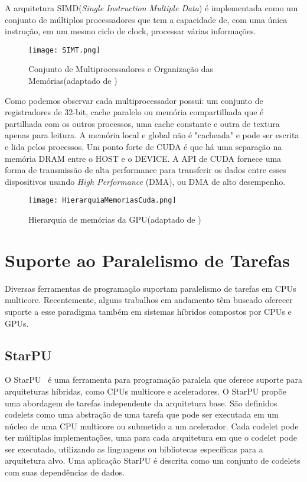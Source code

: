 A arquitetura SIMD(\textit{Single Instruction Multiple Data}) é implementada como um conjunto de múltiplos processadores que tem a capacidade de, com uma única instrução, em um mesmo ciclo de clock, processar várias informações.

\begin{figure}[!htb]
	\begin{center}
	\centering
			\texttt{[image: SIMT.png]}
	\label{fig: SIMT}
	\caption{Conjunto de Multiprocessadores e Organização das Memórias(adaptado de \cite{cuda})}
	\end{center}
\end{figure}

Como podemos observar cada multiprocessador possui: um conjunto de registradores de 32-bit, cache paralelo ou memória compartilhada que é partilhada com os outros processos, uma cache constante e outra de textura apenas para leitura. A memória local e global não é "cacheada" e pode ser escrita e lida pelos processos.
Um ponto forte de CUDA é que há uma separação na memória DRAM entre o HOST e o DEVICE. A API de CUDA fornece uma forma de transmissão de alta performance para transferir os dados entre esses dispositivos usando \textit{High Performance} (DMA), ou DMA de alto desempenho.

\begin{figure}[!htb]
	\begin{center}
	\centering
			\texttt{[image: HierarquiaMemoriasCuda.png]}
	\label{fig: HierarquiaMemoriasCuda}
	\caption{Hierarquia de memórias da GPU(adaptado de \cite{cuda})}
	\end{center}
\end{figure}


\section{Suporte ao Paralelismo de Tarefas}
Diversas ferramentas de programação suportam paralelismo de tarefas em CPUs multicore. Recentemente, alguns trabalhos em andamento têm buscado oferecer suporte a esse paradigma também em sistemas híbridos compostos por CPUs e GPUs.




\subsection{StarPU}
 
O StarPU~\cite{starpu} é uma ferramenta para programação paralela que oferece suporte para arquiteturas híbridas, como CPUs multicore e aceleradores. O StarPU propõe uma abordagem de tarefas independente da arquitetura base. São definidos codelets como uma abstração de uma tarefa que pode ser executada em um núcleo de uma CPU multicore ou submetido a um acelerador. Cada codelet pode ter múltiplas implementações, uma para cada arquitetura em que o codelet pode ser executado, utilizando as linguagens ou bibliotecas específicas para a arquitetura alvo. Uma aplicação StarPU é descrita como um conjunto de codelets com suas dependências de dados.

